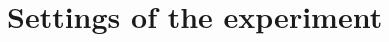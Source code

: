 \documentclass[
  digital,  	%
  color,		%
  oneside,   	%
  12pt,
  nocover,
  notable,
  nolof,
  nolot,
]{fithesis3}
\theoremstyle{definition}
\theoremstyle{remark}
\begin{document}
\section{Settings of the experiment}
\end{document}
